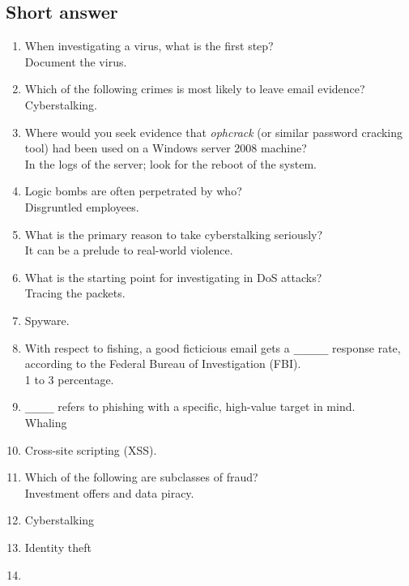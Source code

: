 \subsection{Short answer}
\begin{enumerate}
    \item When investigating a virus, what is the first step?\\Document the virus.
    \item Which of the following crimes is most likely to leave email evidence?\\Cyberstalking.
    \item Where would you seek evidence that \textit{ophcrack} (or similar password cracking tool) had been used on a Windows server 2008 machine?\\In the logs of the server; look for the reboot of the system.
    \item Logic bombs are often perpetrated by who?\\Disgruntled employees.
    \item What is the primary reason to take cyberstalking seriously?\\It can be a prelude to real-world violence.
    \item What is the starting point for investigating in DoS attacks?\\Tracing the packets.
    \item Spyware.
    \item With respect to fishing, a good ficticious email gets a \verb|______| response rate, according to the Federal Bureau of Investigation (FBI).\\1 to 3 percentage.
    \item \verb|_____| refers to phishing with a specific, high-value target in mind.\\Whaling
    \item Cross-site scripting (XSS).
    \item Which of the following are subclasses of fraud?\\Investment offers and data piracy.
    \item Cyberstalking
    \item Identity theft
    \item 
\end{enumerate}